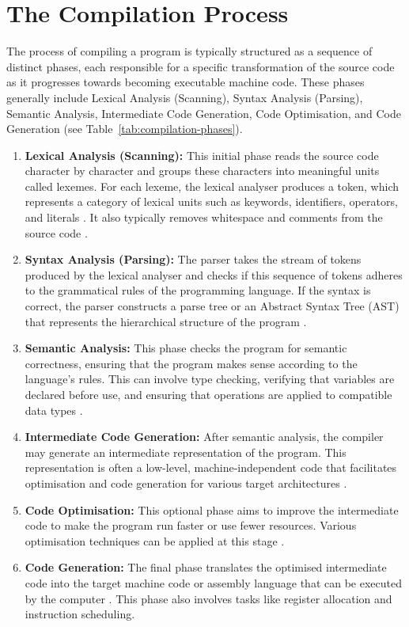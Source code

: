 
\section{The Compilation Process}

The process of compiling a program is typically structured as a sequence of distinct phases, each responsible for a specific transformation of the source code as it progresses towards becoming executable machine code. These phases generally include Lexical Analysis (Scanning), Syntax Analysis (Parsing), Semantic Analysis, Intermediate Code Generation, Code Optimisation, and Code Generation (see Table~\ref{tab:compilation-phases}).


\begin{enumerate}
    \item \textbf{Lexical Analysis (Scanning):} This initial phase reads the source code character by character and groups these characters into meaningful units called lexemes. For each lexeme, the lexical analyser produces a token, which represents a category of lexical units such as keywords, identifiers, operators, and literals \cite{aho2007compilers}. It also typically removes whitespace and comments from the source code \cite{aho2007compilers}.
    \item \textbf{Syntax Analysis (Parsing):} The parser takes the stream of tokens produced by the lexical analyser and checks if this sequence of tokens adheres to the grammatical rules of the programming language. If the syntax is correct, the parser constructs a parse tree or an Abstract Syntax Tree (AST) that represents the hierarchical structure of the program \cite{aho2007compilers}.
    \item \textbf{Semantic Analysis:} This phase checks the program for semantic correctness, ensuring that the program makes sense according to the language's rules. This can involve type checking, verifying that variables are declared before use, and ensuring that operations are applied to compatible data types \cite{aho2007compilers}.
    \item \textbf{Intermediate Code Generation:} After semantic analysis, the compiler may generate an intermediate representation of the program. This representation is often a low-level, machine-independent code that facilitates optimisation and code generation for various target architectures \cite{aho2007compilers}.
    \item \textbf{Code Optimisation:} This optional phase aims to improve the intermediate code to make the program run faster or use fewer resources. Various optimisation techniques can be applied at this stage \cite{aho2007compilers}.
    \item \textbf{Code Generation:} The final phase translates the optimised intermediate code into the target machine code or assembly language that can be executed by the computer \cite{aho2007compilers}. This phase also involves tasks like register allocation and instruction scheduling.
\end{enumerate}


